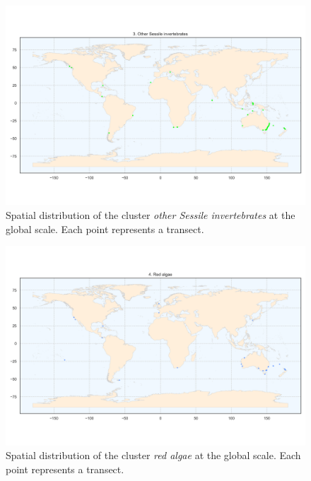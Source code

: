 \begin{figure}
\hypertarget{fig:chap2figS5}{%
\centering
\includegraphics{03-Chapitre2/figures/supplementary/06-spatial-cluster_distribution_cluster_2.png}
\caption{Spatial distribution of the cluster \emph{other Sessile
invertebrates} at the global scale. Each point represents a
transect.}\label{fig:chap2figS5}
}
\end{figure}

\begin{figure}
\hypertarget{fig:chap2figS6}{%
\centering
\includegraphics{03-Chapitre2/figures/supplementary/06-spatial-cluster_distribution_cluster_3.png}
\caption{Spatial distribution of the cluster \emph{red algae} at the
global scale. Each point represents a transect.}\label{fig:chap2figS6}
}
\end{figure}

